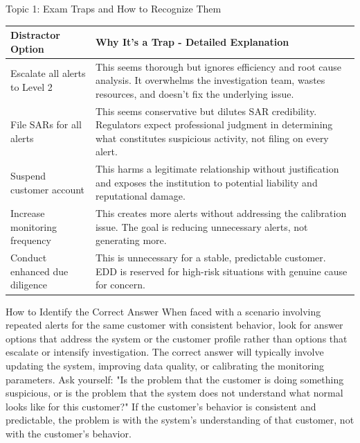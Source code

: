 \documentclass[5pt]{beamer}
\begin{document}
	\begin{frame}{Topic 1: Exam Traps and How to Recognize Them}
		\begin{center}
			\tiny
			\begin{tabular}{|p{2.2cm}|p{3.8cm}|}
				\hline
				\rowcolor{lightgray}
				\textbf{Distractor Option} & \textbf{Why It's a Trap - Detailed Explanation} \\
				\hline
				Escalate all alerts to Level 2 & This seems thorough but ignores efficiency and root cause analysis. It overwhelms the investigation team, wastes resources, and doesn't fix the underlying issue. \\
				\hline
				File SARs for all alerts & This seems conservative but dilutes SAR credibility. Regulators expect professional judgment in determining what constitutes suspicious activity, not filing on every alert. \\
				\hline
				Suspend customer account & This harms a legitimate relationship without justification and exposes the institution to potential liability and reputational damage. \\
				\hline
				Increase monitoring frequency & This creates more alerts without addressing the calibration issue. The goal is reducing unnecessary alerts, not generating more. \\
				\hline
				Conduct enhanced due diligence & This is unnecessary for a stable, predictable customer. EDD is reserved for high-risk situations with genuine cause for concern. \\
				\hline
			\end{tabular}
		\end{center}
		
		\begin{block}{\tiny How to Identify the Correct Answer}
			\tiny When faced with a scenario involving repeated alerts for the same customer with consistent behavior, look for answer options that address the system or the customer profile rather than options that escalate or intensify investigation. The correct answer will typically involve updating the system, improving data quality, or calibrating the monitoring parameters. Ask yourself: "Is the problem that the customer is doing something suspicious, or is the problem that the system does not understand what normal looks like for this customer?" If the customer's behavior is consistent and predictable, the problem is with the system's understanding of that customer, not with the customer's behavior.
		\end{block}
	\end{frame}
	
\end{document}
